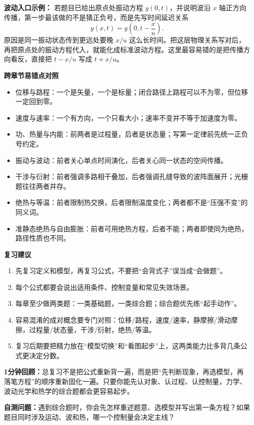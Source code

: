 \documentclass[lang=cn,11pt]{elegantbook}
\newcommand{\summaryline}[1]{\par\noindent\textbf{1分钟回顾：}#1\par}
\newcommand{\chapterselfcheck}[1]{\par\noindent\textbf{自测问题：}#1\par}
\begin{document}
\begin{note}
\textbf{波动入口示例：} 若题目已给出原点处振动方程 \(y(0,t)\)，并说明波沿 \(x\) 轴正方向传播，第一步最该做的不是猜正负号，而是先写时间延迟关系
\[
y(x,t)=y\left(0,t-\frac{x}{u}\right).
\]
原因是同一振动状态传到更远处要晚 \(x/u\) 这么长时间。把这层物理关系写对后，再把原点处的振动方程代入，就能化成标准波动方程。这里最容易错的是把传播方向看反，直接把 \(t-x/u\) 写成 \(t+x/u\)。
\end{note}

\textbf{跨章节易错点对照}

\begin{itemize}
  \item 位移与路程：一个是矢量，一个是标量；闭合路径上路程可以不为零，但位移一定回到零。
  \item 速度与速率：一个有方向，一个只看大小；速率不变并不等于加速度为零。
  \item 功、热量与内能：前两者是过程量，后者是状态量；写第一定律前先统一正负号约定。
  \item 振动与波动：前者关心单点时间演化，后者关心同一状态的空间传播。
  \item 干涉与衍射：前者强调多路相干叠加，后者强调孔缝导致的波阵面展开；光栅题往往两者并存。
  \item 绝热与等温：前者限制热交换，后者限制温度变化；两者都不是“压强不变”的同义词。
  \item 准静态绝热与自由膨胀：前者可用绝热方程，后者不能；两者即使同为绝热，路径性质也不同。
\end{itemize}

\textbf{复习建议}

\begin{remark}
\begin{enumerate}
  \item 先复习定义和模型，再复习公式，不要把“会背式子”误当成“会做题”。
  \item 每个公式都要会说出适用条件、控制变量和常见失效场景。
  \item 每章至少做两类题：一类基础题，一类综合题；综合题优先练“起手动作”。
  \item 容易混淆的成对概念要专门对照：位移/路程，速度/速率，静摩擦/滑动摩擦，过程量/状态量，干涉/衍射，绝热/等温。
  \item 复习后期要把精力放在“模型切换”和“看图起步”上，这两类能力比多背几条公式更决定分数。
\end{enumerate}
\end{remark}

\summaryline{总复习不是把公式重新背一遍，而是把“先判断现象，再选模型，再落笔方程”的顺序重新固化一遍。只要你能先认对象、认过程、认控制量，力学、波动光学和热学的综合题都会更容易起步。}
\chapterselfcheck{遇到综合题时，你会先怎样重述题意、选模型并写出第一条方程？如果题目同时涉及运动、波和热，哪一个控制量会决定主线？}
\end{document}
